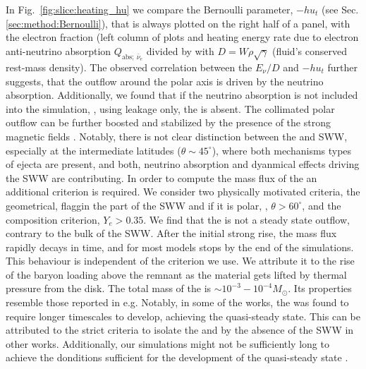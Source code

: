 In Fig.~\ref{fig:slice:heating_hu} we compare the Bernoulli parameter, 
$-hu_t$ (see Sec.\ref{sec:method:Bernoulli}), that is always plotted 
on the right half of a panel, with the electron fraction (left 
column of plots and heating energy rate due to electron anti-neutrino absorption 
$Q_{\text{abs};\:\bar{\nu}_e}$ divided by with $D=W\rho\sqrt{\gamma}$ 
(fluid's conserved rest-mass density).
The observed correlation between the $E_\nu/D$  and $-h u_t$ further suggests, 
that the outflow around the polar axis is driven by the neutrino absorption. 
Additionally, we found that if the neutrino absorption is not included into the 
simulation, \eg, using leakage only, the \nwind{} is absent. 
The collimated polar outflow can be further boosted and stabilized by the presence of the 
strong magnetic fields \citep{Bucciantini:2011kx,Ciolfi:2020hgg,Mosta:2020hlh}.
Notably, there is not clear distinction between the \nwind{} and \ac{SWW}, especially 
at the intermediate latitudes ($\theta \sim 45^{\circ}$), where both mechanisms types of 
ejecta are present, and both, neutrino absorption and dyanmical effects driving the \ac{SWW} 
are contributing. 
In order to compute the mass flux of the \nwind{} an additional criterion is required. 
We consider two physically motivated criteria, the geometrical, flaggin the part of the \ac{SWW} 
and \nwind{} if it is polar, \ie, $\theta>60^{\circ}$, and the composition criterion, $Y_e > 0.35$.
We find that the \nwind{} is not a steady state outflow, contrary to the bulk of the \ac{SWW}.
After the initial strong rise, the mass flux rapidly decays in time, and for most models stops 
by the end of the simulations. This behaviour is independent of the criterion we use. 
We attribute it to the rise of the baryon loading above the remnant as the material gets lifted 
by thermal pressure from the disk.
The total mass of the \nwind{} is ${\sim}10^{-3}-10^{-4}M_{\odot}$. Its properties resemble those 
reported in e.g. \citet{Dessart:2008zd,Perego:2014fma,Fujibayashi:2020dvr}
Notably, in some of the works, the \nwind{} was found to require longer timescales to develop, 
achieving the quasi-steady state. 
This can be attributed to the strict criteria to isolate the \nwind{} and by the absence of the 
\ac{SWW} in other works. 
Additionally, our simulations might not be sufficiently long to achieve the donditions 
sufficient for the development of the quasi-steady state \nwind{}.


